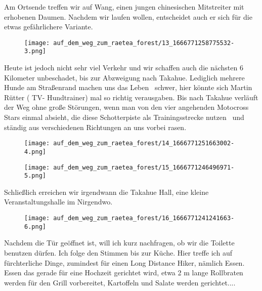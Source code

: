   Am Ortsende treffen wir auf Wang, einen jungen chinesischen Mitstreiter mit erhobenen Daumen. Nachdem wir laufen wollen, entscheidet auch er sich für die etwas gefährlichere Variante.
 


\begin{figure}[H]
	\centering
	\texttt{[image: auf\_dem\_weg\_zum\_raetea\_forest/13\_1666771258775532-3.png]}
	\caption{}
	\label{fig:13_1666771258775532-3}
\end{figure}

  Heute ist jedoch nicht sehr viel Verkehr und wir schaffen auch die nächsten 6 Kilometer unbeschadet, bis zur Abzweigung nach Takahue. Lediglich mehrere Hunde am Straßenrand machen uns das Leben  schwer, hier könnte sich Martin Rütter ( TV- Hundtrainer) mal so richtig verausgaben. Bis nach Takahue verläuft der Weg ohne große Störungen, wenn man von den vier angehenden Motocross Stars einmal absieht, die diese Schotterpiste als Trainingsstrecke nutzen  und ständig aus verschiedenen Richtungen an uns vorbei rasen.
 


\begin{figure}[H]
	\centering
	\texttt{[image: auf\_dem\_weg\_zum\_raetea\_forest/14\_1666771251663002-4.png]}
	\caption{}
	\label{fig:14_1666771251663002-4}
\end{figure}

\begin{figure}[H]
	\centering
	\texttt{[image: auf\_dem\_weg\_zum\_raetea\_forest/15\_1666771246496971-5.png]}
	\caption{}
	\label{fig:15_1666771246496971-5}
\end{figure}

  Schließlich erreichen wir irgendwann die Takahue Hall, eine kleine Veranstaltungshalle im Nirgendwo.
 


\begin{figure}[H]
	\centering
	\texttt{[image: auf\_dem\_weg\_zum\_raetea\_forest/16\_1666771241241663-6.png]}
	\caption{}
	\label{fig:16_1666771241241663-6}
\end{figure}

  Nachdem die Tür geöffnet ist, will ich kurz nachfragen, ob wir die Toilette benutzen dürfen. Ich folge den Stimmen bis zur Küche. Hier treffe ich auf fürchterliche Dinge, zumindest für einen Long Distance Hiker, nämlich Essen. Essen das gerade für eine Hochzeit gerichtet wird, etwa 2 m lange Rollbraten werden für den Grill vorbereitet, Kartoffeln und Salate werden gerichtet....
 


